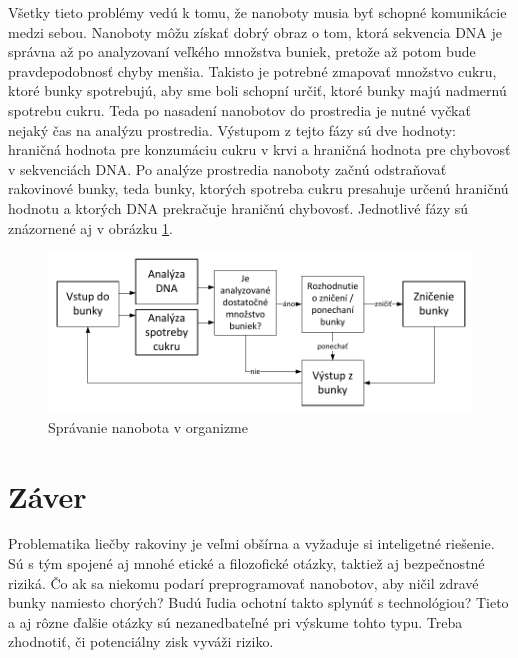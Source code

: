 \documentclass[10pt,twoside,slovak,a4paper]{article}
\begin{document}
Všetky tieto problémy vedú k tomu, že nanoboty musia byť schopné komunikácie medzi sebou. Nanoboty môžu získať dobrý obraz o tom, ktorá sekvencia DNA je správna až po analyzovaní veľkého množstva buniek, pretože až potom bude pravdepodobnosť chyby menšia. Takisto je potrebné zmapovať množstvo cukru, ktoré bunky spotrebujú, aby sme boli schopní určiť, ktoré bunky majú nadmernú spotrebu cukru. Teda po nasadení nanobotov do prostredia je nutné vyčkať nejaký čas na analýzu prostredia. Výstupom z tejto fázy sú dve hodnoty: hraničná hodnota pre konzumáciu cukru v krvi a hraničná hodnota pre chybovosť v sekvenciách DNA. Po analýze prostredia nanoboty začnú odstraňovať rakovinové bunky, teda bunky, ktorých spotreba cukru presahuje určenú hraničnú hodnotu a ktorých DNA prekračuje hraničnú chybovosť. Jednotlivé fázy sú znázornené aj v obrázku \ref{f:spravanie}.

\begin{figure}[tbh]
\label{f:spravanie}
\centering
\includegraphics[scale=0.9]{spravanie.pdf}
\caption{Správanie nanobota v organizme}
\end{figure}
\section{Záver}

Problematika liečby rakoviny je veľmi obšírna a vyžaduje si inteligetné riešenie. Sú s tým spojené aj mnohé etické a filozofické otázky, taktiež aj bezpečnostné riziká. Čo ak sa niekomu podarí preprogramovať nanobotov, aby ničil zdravé bunky namiesto chorých? Budú ľudia ochotní takto splynúť s technológiou? Tieto a aj rôzne ďalšie otázky sú nezanedbateľné pri výskume tohto typu. Treba zhodnotiť, či potenciálny zisk vyváži riziko.

\listoffigures


\end{document}
